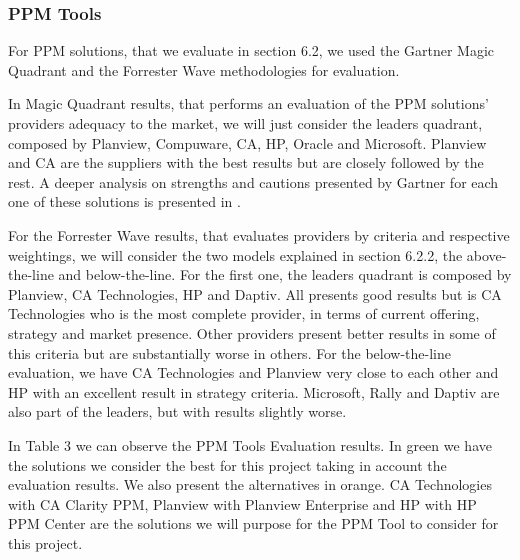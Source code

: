 \subsubsection{PPM Tools}

For PPM solutions, that we evaluate in section 6.2, we used the Gartner Magic Quadrant and the Forrester Wave methodologies for evaluation.\par
In Magic Quadrant results, that performs an evaluation of the PPM solutions' providers adequacy to the market, we will just consider the leaders quadrant, composed by Planview, Compuware, CA, HP, Oracle and Microsoft. Planview and CA are the suppliers with the best results but are closely followed by the rest. A deeper analysis on strengths and cautions presented by Gartner for each one of these solutions is presented in \cite{magicQuadrantPPM}.\par
For the Forrester Wave results, that evaluates providers by criteria and respective weightings, we will consider the two models explained in section 6.2.2, the above-the-line and below-the-line. For the first one, the leaders quadrant is composed by Planview, CA Technologies, HP and Daptiv. All presents good results but is CA Technologies who is the most complete provider, in terms of current offering, strategy and market presence. Other providers present better results in some of this criteria but are substantially worse in others. For the below-the-line evaluation, we have CA Technologies and Planview very close to each other and HP with an excellent result in strategy criteria. Microsoft, Rally and Daptiv are also part of the leaders, but with results slightly worse.\par
In Table 3 we can observe the PPM Tools Evaluation results. In green we have the solutions we consider the best for this project taking in account the evaluation results. We also present the alternatives in orange. CA Technologies with CA Clarity PPM, Planview with Planview Enterprise and HP with HP PPM Center are the solutions we will purpose for the PPM Tool to consider for this project.


